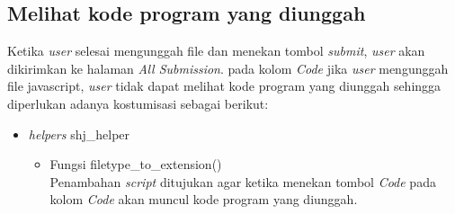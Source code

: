   \subsection{Melihat kode program yang diunggah}
 \label{sec: Meilihat kode program yang diunggah}
 Ketika \textit{user} selesai mengunggah file dan menekan tombol \textit{submit}, \textit{user} akan dikirimkan ke halaman \textit{All Submission}. pada kolom \textit{Code} jika \textit{user} mengunggah file javascript, \textit{user} tidak dapat melihat kode program yang diunggah sehingga diperlukan adanya kostumisasi sebagai berikut: 
 
 \begin{itemize}
     \item \textit{helpers} shj\_helper
     \begin{itemize}
        \item Fungsi filetype\_to\_extension()\\  Penambahan \textit{script} ditujukan agar ketika menekan tombol \textit{Code} pada kolom \textit{Code} akan muncul kode program yang diunggah.
     \end{itemize}
 \end{itemize}